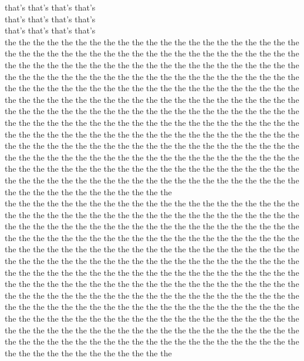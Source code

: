 that's that's that's that's\\
that's that's that's that's\\
that's that's that's that's\\
the the the the the the the the the the the the the the the the the the the the the the the the the the the the the the the the the the the the the the the the the the the the the the the the the the the the the the the the the the the the the the the the the the the the the the the the the the the the the the the the the the the the the the the the the the the the the the the the the the the the the the the the the the the the the the the the the the the the the the the the the the the the the the the the the the the the the the the the the the the the the the the the the the the the the the the the the the the the the the the the the the the the the the the the the the the the the the the the the the the the the the the the the the the the the the the the the the the the the the the the the the the the the the the the the the the the the the the the the the the the the the the the the the the the the the the the the the the the the the the the the the the the the the the the the the the the the the the the the the the the the the the the the the the the the the the the the the the the the the the the the the the the the\\
the the the the the the the the the the the the the the the the the the the the the the the the the the the the the the the the the the the the the the the the the the the the the the the the the the the the the the the the the the the the the the the the the the the the the the the the the the the the the the the the the the the the the the the the the the the the the the the the the the the the the the the the the the the the the the the the the the the the the the the the the the the the the the the the the the the the the the the the the the the the the the the the the the the the the the the the the the the the the the the the the the the the the the the the the the the the the the the the the the the the the the the the the the the the the the the the the the the the the the the the the the the the the the the the the the the the the the the the the the the the the the the the the the the the the the the the the the the the the the the the the the the the the the the the the the the the the the the the the the the the the the the the the the the the the the the the the the the the the the the the the the the the the\\
